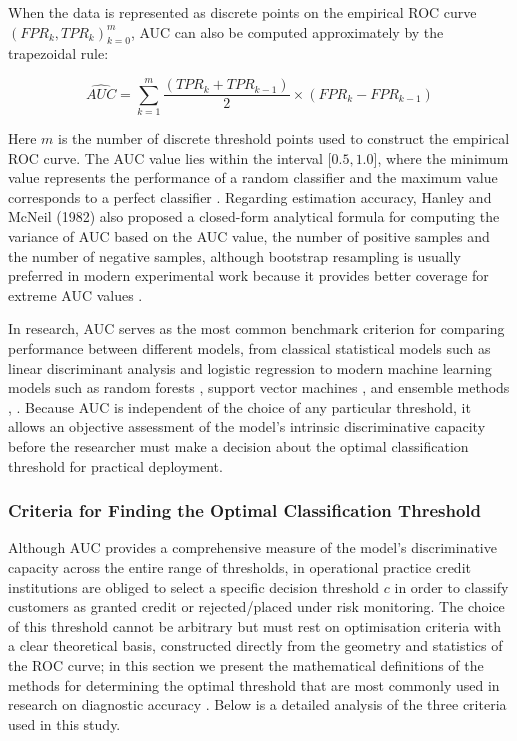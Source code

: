 \vspace{1em}
When the data is represented as discrete points on the empirical ROC curve $(FPR_k, TPR_k)_{k=0}^{m}$, AUC can also be computed approximately by the trapezoidal rule:

\begin{equation}
    \widehat{AUC} = \sum_{k=1}^{m} \frac{(TPR_k + TPR_{k-1})}{2} \times (FPR_k - FPR_{k-1})
\end{equation}

\vspace{1em}
Here $m$ is the number of discrete threshold points used to construct the empirical ROC curve. The AUC value lies within the interval [$0.5,1.0$], where the minimum value represents the performance of a random classifier and the maximum value corresponds to a perfect classifier \cite{hanley1982meaning}. Regarding estimation accuracy, Hanley and McNeil (1982) also proposed a closed-form analytical formula for computing the variance of AUC based on the AUC value, the number of positive samples and the number of negative samples, although bootstrap resampling is usually preferred in modern experimental work because it provides better coverage for extreme AUC values \cite{hanley1982meaning}.

In research, AUC serves as the most common benchmark criterion for comparing performance between different models, from classical statistical models such as linear discriminant analysis \cite{altman1968financial} and logistic regression \cite{ohlson1980financial} to modern machine learning models such as random forests \cite{breiman2001random}, support vector machines \cite{vapnik1998statistical}, \cite{shen2022credit} and ensemble methods \cite{breiman1996bagging}, \cite{friedman2001greedy}. Because AUC is independent of the choice of any particular threshold, it allows an objective assessment of the model's intrinsic discriminative capacity before the researcher must make a decision about the optimal classification threshold for practical deployment.

\subsubsection{Criteria for Finding the Optimal Classification Threshold}
\noindent
Although AUC provides a comprehensive measure of the model's discriminative capacity across the entire range of thresholds, in operational practice credit institutions are obliged to select a specific decision threshold $c$ in order to classify customers as granted credit or rejected/placed under risk monitoring. The choice of this threshold cannot be arbitrary but must rest on optimisation criteria with a clear theoretical basis, constructed directly from the geometry and statistics of the ROC curve; in this section we present the mathematical definitions of the methods for determining the optimal threshold that are most commonly used in research on diagnostic accuracy \cite{unal2017defining}. Below is a detailed analysis of the three criteria used in this study.

